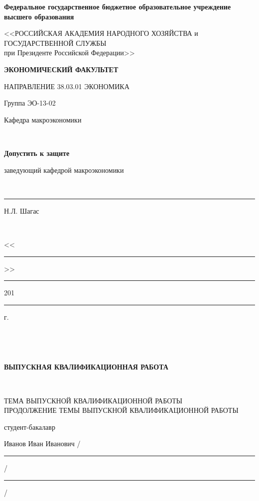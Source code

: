 \documentclass[12pt,a4paper, oneside]{extreport}
\begin{document}

\thispagestyle{empty} %

\begingroup
{}   %
\begin{center}
\small \bfseries Федеральное государственное бюджетное образовательное учреждение высшего образования

<<РОССИЙСКАЯ АКАДЕМИЯ НАРОДНОГО ХОЗЯЙСТВА и\\ ГОСУДАРСТВЕННОЙ СЛУЖБЫ \\
при Президенте Российской Федерации>>

\vspace{2ex}

\bfseries
ЭКОНОМИЧЕСКИЙ ФАКУЛЬТЕТ

НАПРАВЛЕНИЕ 38.03.01 ЭКОНОМИКА
\end{center}

\vfill


\noindent  Группа ЭО-13-02
\hfill
\parbox[t]{20em}{\centering
Кафедра макроэкономики

\mbox{ }

\textbf{Допустить к защите}

заведующий кафедрой макроэкономики

\mbox{ }

\rule{8em}{0.5pt} Н.Л. Шагас

\mbox{ }

<<\rule{2em}{0.5pt}>> \rule{5em}{0.5pt} 201\rule{1em}{0.5pt} г. }

\mbox{ }

\mbox{ }

\begin{center}\bfseries
ВЫПУСКНАЯ КВАЛИФИКАЦИОННАЯ РАБОТА

\mbox{ }

\large
ТЕМА ВЫПУСКНОЙ КВАЛИФИКАЦИОННОЙ РАБОТЫ \\
ПРОДОЛЖЕНИЕ ТЕМЫ ВЫПУСКНОЙ КВАЛИФИКАЦИОННОЙ РАБОТЫ
\end{center}

\vfill

\noindent\normalsize
студент-бакалавр

\noindent
Иванов Иван Иванович
\hfill /\rule{6em}{0.5pt}/\rule{6em}{0.5pt}/

\hfill{}
\end{document}
